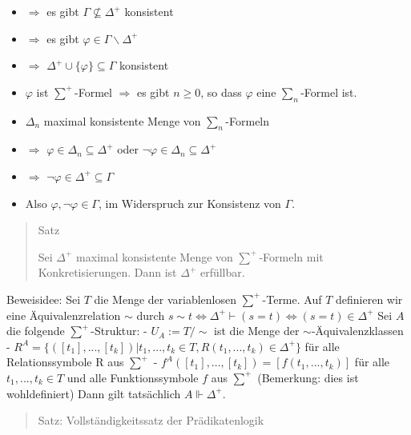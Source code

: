 \documentclass[a4paper]{article}
\begin{document}
\begin{multicols}{3}
\begin{itemize}
          \begin{itemize}
            \item
                  $\Rightarrow$ es gibt $\Gamma\not\subseteq\Delta^+$ konsistent
            \item
                  $\Rightarrow$ es gibt $\varphi\in\Gamma\backslash\Delta^+$
            \item
                  $\Rightarrow$ $\Delta^+\cup\{\varphi\}\subseteq\Gamma$ konsistent
            \item
                  $\varphi$ ist $\sum^+$-Formel $\Rightarrow$ es gibt $n\geq 0$, so
                  dass $\varphi$ eine $\sum_n$-Formel ist.
            \item
                  $\Delta_n$ maximal konsistente Menge von $\sum_n$-Formeln
            \item
                  $\Rightarrow$ $\varphi\in\Delta_n\subseteq\Delta^+$ oder
                  $\lnot\varphi\in\Delta_n\subseteq\Delta^+$
            \item
                  $\Rightarrow$ $\lnot\varphi\in\Delta^+\subseteq\Gamma$
            \item
                  Also $\varphi,\lnot\varphi\in\Gamma$, im Widerspruch zur Konsistenz
                  von $\Gamma$.
          \end{itemize}
  \end{itemize}

  \begin{quote}
    Satz

    Sei $\Delta^+$ maximal konsistente Menge von $\sum^+$-Formeln mit
    Konkretisierungen. Dann ist $\Delta^+$ erfüllbar.
  \end{quote}

  Beweisidee: Sei $T$ die Menge der variablenlosen $\sum^+$-Terme. Auf $T$
  definieren wir eine Äquivalenzrelation $\sim $ durch
  $s\sim t\Leftrightarrow \Delta^+\vdash(s=t)\Leftrightarrow (s=t)\in\Delta^+$
  Sei $A$ die folgende $\sum^+$-Struktur: - $U_A:=T/\sim $ ist die Menge der
  $\sim $-Äquivalenzklassen -
  $R^A=\{([t_1],...,[t_k])|t_1 ,...,t_k\in T,R(t_1,...,t_k)\in\Delta^+\}$
  für alle Relationssymbole R aus $\sum^+$ -
  $f^A([t_1],...,[t_k]) = [f(t_1,...,t_k)]$ für alle $t_1,...,t_k\in T$
  und alle Funktionssymbole $f$ aus $\sum^+$ (Bemerkung: dies ist
  wohldefiniert) Dann gilt tatsächlich $A\Vdash\Delta^+$.

  \begin{quote}
    Satz: Vollständigkeitssatz der Prädikatenlogik


\end{quote}
\end{multicols}
\end{document}
